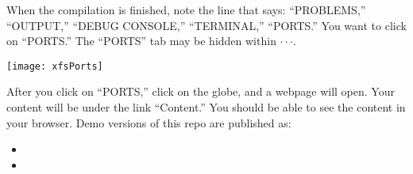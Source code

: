 \documentclass{ximera}
\begin{document}
\newpage
 When the compilation is finished, note the line that says:
``PROBLEMS,'' ``OUTPUT,'' ``DEBUG CONSOLE,'' ``TERMINAL,'' ``PORTS.'' You want to click on ``PORTS.'' The ``PORTS'' tab may be hidden within $\cdot \cdot \cdot$.  
\begin{image}
    \texttt{[image: xfsPorts]}
\end{image}
After you click on ``PORTS,'' click on the globe, and a webpage will open. Your content will be under the link ``Content.'' You should be able to see the content in your browser. 
Demo versions of this repo are published as:
\begin{itemize}
\item {}
\item {}
\end{itemize}
\pdfOnly{\twocolumn}
\end{document}
